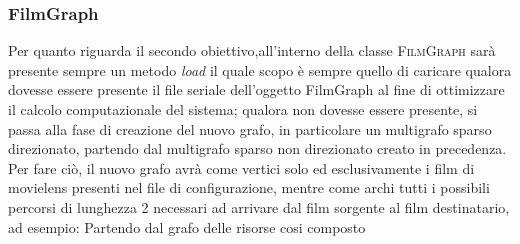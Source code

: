 \subsubsection{FilmGraph}
Per quanto riguarda il secondo obiettivo,all'interno della classe \textsc{FilmGraph} sarà presente sempre un metodo \emph{load} il quale scopo è sempre quello di caricare qualora dovesse essere presente il file seriale dell'oggetto FilmGraph al fine di ottimizzare il calcolo computazionale del sistema; qualora non dovesse essere presente, si passa alla fase di creazione del nuovo grafo, in particolare un multigrafo sparso direzionato, partendo dal multigrafo sparso non direzionato creato in precedenza.
Per fare ciò, il nuovo grafo avrà come vertici solo ed esclusivamente i film di movielens presenti nel file di configurazione, mentre come archi tutti i possibili percorsi di lunghezza 2 necessari ad arrivare dal film sorgente al film destinatario, ad esempio: Partendo dal grafo delle risorse cosi composto 
